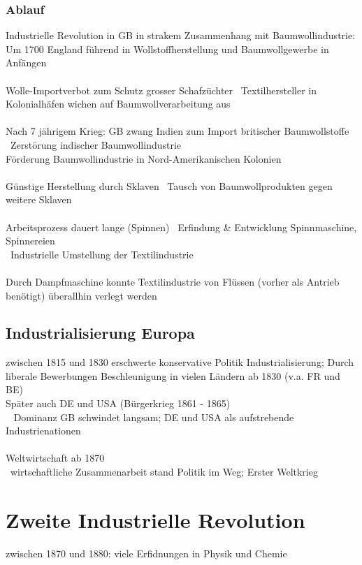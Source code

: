 \documentclass{report}
\begin{document}
\subsection{Ablauf}
Industrielle Revolution in GB in strakem Zusammenhang mit Baumwollindustrie:\\
Um 1700 England führend in Wollstoffherstellung und Baumwollgewerbe in Anfängen\\\\
Wolle-Importverbot zum Schutz grosser Schafzüchter \arrow~Textilhersteller in Kolonialhäfen wichen auf Baumwollverarbeitung aus\\\\
Nach 7 jährigem Krieg: GB zwang Indien zum Import britischer Baumwollstoffe \arrow~Zerstörung indischer Baumwollindustrie\\
Förderung Baumwollindustrie in Nord-Amerikanischen Kolonien\\\\
Günstige Herstellung durch Sklaven \arrow~Tausch von Baumwollprodukten gegen weitere Sklaven\\\\
Arbeitsprozess dauert lange (Spinnen) \arrow~Erfindung \& Entwicklung Spinnmaschine, Spinnereien\\
\arrow~Industrielle Umstellung der Textilindustrie\\\\
Durch Dampfmaschine konnte Textilindustrie von Flüssen (vorher als Antrieb benötigt) überallhin verlegt werden 

\section{Industrialisierung Europa}
zwischen 1815 und 1830 erschwerte konservative Politik Industrialisierung; Durch liberale Bewerbungen Beschleunigung in vielen Ländern ab 1830 (v.a. FR und BE)\\
Später auch DE und USA (Bürgerkrieg 1861 - 1865)\\
\arrow~ Dominanz GB schwindet langsam; DE und USA als aufstrebende Industrienationen\\\\
Weltwirtschaft ab 1870\\
\arrow~wirtschaftliche Zusammenarbeit stand Politik im Weg; Erster Weltkrieg

\newpage

\chapter{Zweite Industrielle Revolution}
zwischen 1870 und 1880: viele Erfidnungen in Physik und Chemie
\end{document}
